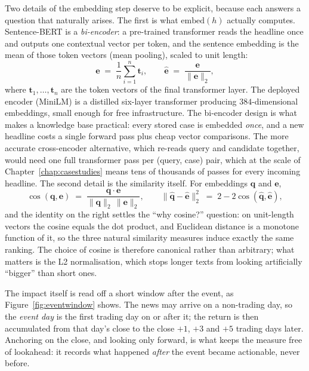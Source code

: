 Two details of the embedding step deserve to be explicit, because each answers a question that
naturally arises. The first is what $\mathrm{embed}(h)$ actually computes. Sentence-BERT is a
\emph{bi-encoder}: a pre-trained transformer reads the headline once and outputs one contextual vector
per token, and the sentence embedding is the mean of those token vectors (mean pooling), scaled to unit
length:
\begin{equation}
\mathbf{e} \;=\; \frac{1}{n}\sum_{i=1}^{n} \mathbf{t}_i,
\qquad
\hat{\mathbf{e}} \;=\; \frac{\mathbf{e}}{\lVert \mathbf{e} \rVert_2},
\label{eq:pooling}
\end{equation}
where $\mathbf{t}_1,\dots,\mathbf{t}_n$ are the token vectors of the final transformer layer. The
deployed encoder (MiniLM) is a distilled six-layer transformer producing $384$-dimensional embeddings,
small enough for free infrastructure. The bi-encoder design is what makes a knowledge base practical:
every stored case is embedded \emph{once}, and a new headline costs a single forward pass plus cheap
vector comparisons. The more accurate cross-encoder alternative, which re-reads query and candidate
together, would need one full transformer pass per (query, case) pair, which at the scale of
Chapter~\ref{chap:casestudies} means tens of thousands of passes for every incoming headline. The second
detail is the similarity itself. For embeddings $\mathbf{q}$ and $\mathbf{e}$,
\begin{equation}
\cos(\mathbf{q},\mathbf{e}) \;=\;
\frac{\mathbf{q}\cdot\mathbf{e}}{\lVert\mathbf{q}\rVert_2\,\lVert\mathbf{e}\rVert_2},
\qquad
\lVert \hat{\mathbf{q}} - \hat{\mathbf{e}} \rVert_2^2 \;=\; 2 - 2\cos(\hat{\mathbf{q}},\hat{\mathbf{e}}),
\label{eq:cosine}
\end{equation}
and the identity on the right settles the ``why cosine?'' question: on unit-length vectors the cosine
equals the dot product, and Euclidean distance is a monotone function of it, so the three natural
similarity measures induce exactly the same ranking. The choice of cosine is therefore canonical rather
than arbitrary; what matters is the L2 normalisation, which stops longer texts from looking artificially
``bigger'' than short ones.

The impact itself is read off a short window after the event, as Figure~\ref{fig:eventwindow} shows. The
news may arrive on a non-trading day, so the \emph{event day} is the first trading day on or after it;
the return is then accumulated from that day's close to the close $+1$, $+3$ and $+5$ trading days later.
Anchoring on the close, and looking only forward, is what keeps the measure free of lookahead: it records
what happened \emph{after} the event became actionable, never before.

